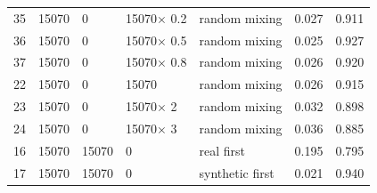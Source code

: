 \documentclass[letterpaper]{article} %
\begin{document}
\begin{table}[t]
{\begin{tabular}{lllllll}
			35& 15070 &0 & 15070$\times$ 0.2   &random mixing &0.027 &0.911 \\
			36& 15070 &0 & 15070$\times$ 0.5   &random mixing &0.025 &0.927 \\
			37& 15070 &0 & 15070$\times$ 0.8   &random mixing &0.026 &0.920 \\
			22& 15070 &0 & 15070           &random mixing &0.026 &0.915 \\
			23& 15070 &0 & 15070$\times$ 2 &random mixing &0.032 &0.898 \\
			24& 15070 &0 & 15070$\times$ 3 &random mixing &0.036 &0.885 \\
			
			16& 15070 & 15070 &0  &real first &0.195 &0.795 \\
			17& 15070 & 15070 &0  &synthetic
			first &0.021 &0.940 \\
			\bottomrule
		\end{tabular}
	}
	\label{use_test}
\end{table}
\end{document}
